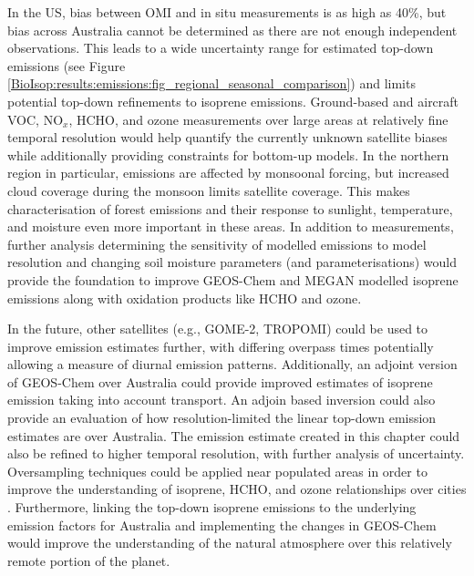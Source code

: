   In the US, bias between OMI and in situ measurements is as high as 40\%, but 
  bias across Australia cannot be determined as there are not enough independent observations.
  This leads to a wide uncertainty range for estimated top-down emissions (see Figure \ref{BioIsop:results:emissions:fig_regional_seasonal_comparison}) and limits potential top-down refinements to isoprene emissions.
  Ground-based and aircraft VOC, NO$_x$, HCHO, and ozone measurements over large areas at relatively fine temporal resolution would help quantify the currently unknown satellite biases while additionally providing constraints for bottom-up models.
  In the northern region in particular, emissions are affected by monsoonal forcing, but increased cloud coverage during the monsoon limits satellite coverage. 
  This makes characterisation of forest emissions and their response to sunlight, temperature, and moisture even more important in these areas.
  In addition to measurements, further analysis determining the sensitivity of modelled emissions to model resolution and changing soil moisture parameters (and parameterisations) would provide the foundation to improve GEOS-Chem and MEGAN modelled isoprene emissions along with oxidation products like HCHO and ozone.
  
  In the future, other satellites (e.g., GOME-2, TROPOMI) could be used to improve emission estimates further, with differing overpass times potentially allowing a measure of diurnal emission patterns.
  Additionally, an adjoint version of GEOS-Chem over Australia could provide improved estimates of isoprene emission taking into account transport.
  An adjoin based inversion could also provide an evaluation of how resolution-limited the linear top-down emission estimates are over Australia.
  The emission estimate created in this chapter could also be refined to higher temporal resolution, with further analysis of uncertainty.
  Oversampling techniques could be applied near populated areas in order to improve the understanding of isoprene, HCHO, and ozone relationships over cities \parencite[e.g.,][]{Surl2018}.
  Furthermore, linking the top-down isoprene emissions to the underlying emission factors for Australia and implementing the changes in GEOS-Chem would improve the understanding of the natural atmosphere over this relatively remote portion of the planet. %

%  
  